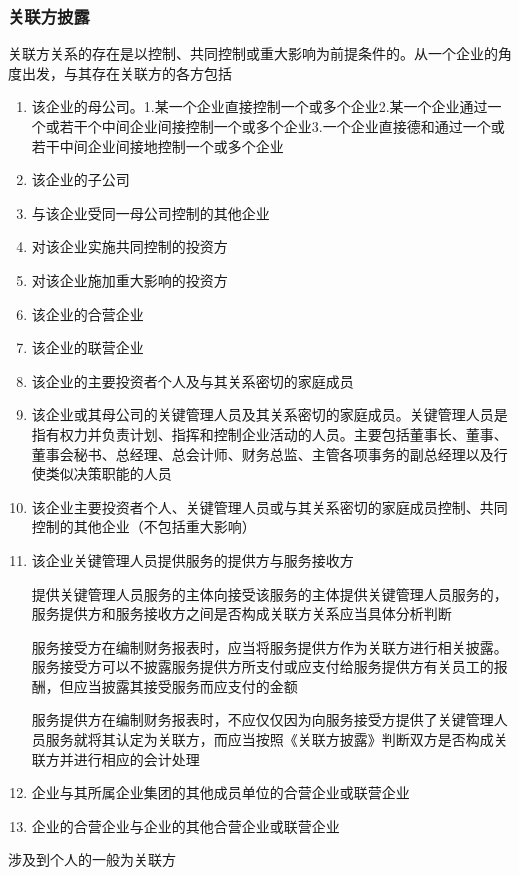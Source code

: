 \documentclass[UTF8,12pt]{ctexart}
\numberwithin{equation}{section} %
\numberwithin{figure}{section}
\numberwithin{table}{section}
\begin{document}
	\subsubsection{关联方披露}
	关联方关系的存在是以控制、共同控制或重大影响为前提条件的。从一个企业的角度出发，与其存在关联方的各方包括
	\begin{enumerate}
		\item 该企业的母公司。1.某一个企业直接控制一个或多个企业2.某一个企业通过一个或若干个中间企业间接控制一个或多个企业3.一个企业直接德和通过一个或若干中间企业间接地控制一个或多个企业
		
		\item 该企业的子公司
		
		\item 与该企业受同一母公司控制的其他企业
		
		\item 对该企业实施共同控制的投资方
		
		\item 对该企业施加重大影响的投资方
		
		\item 该企业的合营企业
		
		\item 该企业的联营企业
		
		\item 该企业的主要投资者个人及与其关系密切的家庭成员
		
		\item 该企业或其母公司的关键管理人员及其关系密切的家庭成员。关键管理人员是指有权力并负责计划、指挥和控制企业活动的人员。主要包括董事长、董事、董事会秘书、总经理、总会计师、财务总监、主管各项事务的副总经理以及行使类似决策职能的人员
		
		\item 该企业主要投资者个人、关键管理人员或与其关系密切的家庭成员控制、共同控制的其他企业（不包括重大影响）
		
		\item 该企业关键管理人员提供服务的提供方与服务接收方
		
		提供关键管理人员服务的主体向接受该服务的主体提供关键管理人员服务的，服务提供方和服务接收方之间是否构成关联方关系应当具体分析判断
		
		服务接受方在编制财务报表时，应当将服务提供方作为关联方进行相关披露。服务接受方可以不披露服务提供方所支付或应支付给服务提供方有关员工的报酬，但应当披露其接受服务而应支付的金额
		
		服务提供方在编制财务报表时，不应仅仅因为向服务接受方提供了关键管理人员服务就将其认定为关联方，而应当按照《关联方披露》判断双方是否构成关联方并进行相应的会计处理
		
		\item 企业与其所属企业集团的其他成员单位的合营企业或联营企业
		
		\item 企业的合营企业与企业的其他合营企业或联营企业
	\end{enumerate}
	涉及到个人的一般为关联方
	
\end{document}
